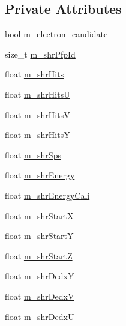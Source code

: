 \subsection*{Private Attributes}
\begin{DoxyCompactItemize}
\item 
bool \hyperlink{classselection_1_1CCincSelection_a61b7a5e571eac85c8171a3dbd6ab57c6}{m\-\_\-electron\-\_\-candidate}
\item 
size\-\_\-t \hyperlink{classselection_1_1CCincSelection_ad792c1259135d226df875d1150776ce9}{m\-\_\-shr\-Pfp\-Id}
\item 
float \hyperlink{classselection_1_1CCincSelection_a964f3aac8e99293d36792be15e9f2816}{m\-\_\-shr\-Hits}
\item 
float \hyperlink{classselection_1_1CCincSelection_a838d15088def4e962fdd1b664c5960e1}{m\-\_\-shr\-Hits\-U}
\item 
float \hyperlink{classselection_1_1CCincSelection_a35d27e317a7c161b6051fde267d08850}{m\-\_\-shr\-Hits\-V}
\item 
float \hyperlink{classselection_1_1CCincSelection_a5df838908bc1b3428f0c8c50209f4f0d}{m\-\_\-shr\-Hits\-Y}
\item 
float \hyperlink{classselection_1_1CCincSelection_a674a7e5b50475f3afa692bc7a47f5f22}{m\-\_\-shr\-Sps}
\item 
float \hyperlink{classselection_1_1CCincSelection_a2650ff351a7a6589c2b6ff9f701da321}{m\-\_\-shr\-Energy}
\item 
float \hyperlink{classselection_1_1CCincSelection_adec1b19741776f6e33a88b4d0f2b6330}{m\-\_\-shr\-Energy\-Cali}
\item 
float \hyperlink{classselection_1_1CCincSelection_a692099d6cabdf30bfd269f35c3193971}{m\-\_\-shr\-Start\-X}
\item 
float \hyperlink{classselection_1_1CCincSelection_a60b711d11ef5b1ce99992df868e900c7}{m\-\_\-shr\-Start\-Y}
\item 
float \hyperlink{classselection_1_1CCincSelection_ac97b3d4c8f1dff8f692de9fc2c9f585c}{m\-\_\-shr\-Start\-Z}
\item 
float \hyperlink{classselection_1_1CCincSelection_aca70f9a6dfad2d0ed4c2ef4c71fe37bd}{m\-\_\-shr\-Dedx\-Y}
\item 
float \hyperlink{classselection_1_1CCincSelection_a2d1f501922cf14e3d1f6fb8cc8e63173}{m\-\_\-shr\-Dedx\-V}
\item 
float \hyperlink{classselection_1_1CCincSelection_a8874fb100e151832807ab459419e69d3}{m\-\_\-shr\-Dedx\-U}
\item 

\end{DoxyCompactItemize}
